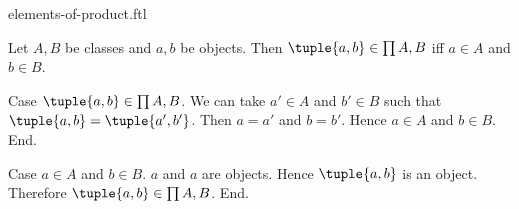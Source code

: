 \documentclass{article}
\begin{document}
\begin{smodule}[creators={Marcel Schütz}]{elements-of-product.ftl}

  \begin{fproposition*}[label=5212790899867648]
    Let $A, B$ be classes and $a, b$ be objects.
    Then $\tuple{a,b} \in \prod{A,B}$ iff $a \in A$ and $b \in B$.
  \end{fproposition*}
  \begin{fproof}
    Case $\tuple{a,b} \in \prod{A,B}$.
      We can take $a' \in A$ and $b' \in B$ such that $\tuple{a,b} = \tuple{a',b'}$.
      Then $a = a'$ and $b = b'$.
      Hence $a \in A$ and $b \in B$.
    End.

    Case $a \in A$ and $b \in B$.
      $a$ and $a$ are objects.
      Hence $\tuple{a,b}$ is an object.
      Therefore $\tuple{a,b} \in \prod{A,B}$.
    End.
  \end{fproof}
\end{smodule}
\end{document}
